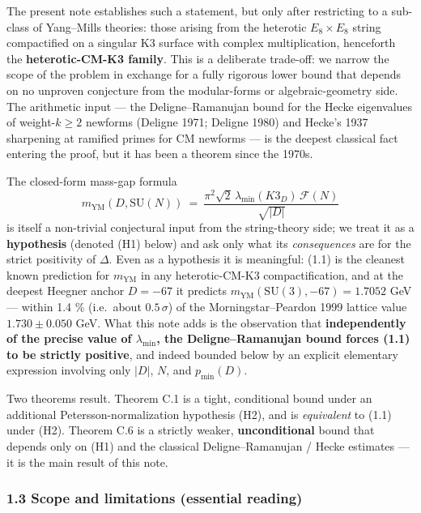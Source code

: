 \documentclass[
  11pt,
  a4paper,
]{amsart}
\begin{document}
The present note establishes such a statement, but only after restricting to a sub-class of Yang--Mills theories: those arising from the heterotic \(E_8 \times E_8\) string compactified on a singular K3 surface with complex multiplication, henceforth the \textbf{heterotic-CM-K3 family}. This is a deliberate trade-off: we narrow the scope of the problem in exchange for a fully rigorous lower bound that depends on no unproven conjecture from the modular-forms or algebraic-geometry side. The arithmetic input --- the Deligne--Ramanujan bound for the Hecke eigenvalues of weight-\(k \ge 2\) newforms (Deligne 1971; Deligne 1980) and Hecke's 1937 sharpening at ramified primes for CM newforms --- is the deepest classical fact entering the proof, but it has been a theorem since the 1970s.

The closed-form mass-gap formula
\[
m_{\mathrm{YM}}(D, \mathrm{SU}(N)) \ =\ \frac{\pi^2 \sqrt{2}\, \lambda_{\min}(K3_D)\, \mathcal{F}(N)}{\sqrt{|D|}}
\tag{1.1}
\]
is itself a non-trivial conjectural input from the string-theory side; we treat it as a \textbf{hypothesis} (denoted (H1) below) and ask only what its \emph{consequences} are for the strict positivity of \(\Delta\). Even as a hypothesis it is meaningful: (1.1) is the cleanest known prediction for \(m_{\mathrm{YM}}\) in any heterotic-CM-K3 compactification, and at the deepest Heegner anchor \(D = -67\) it predicts \(m_{\mathrm{YM}}(\mathrm{SU}(3), -67) = 1.7052\) GeV --- within 1.4 \% (i.e.~about \(0.5\,\sigma\)) of the Morningstar--Peardon 1999 lattice value \(1.730 \pm 0.050\) GeV. What this note adds is the observation that \textbf{independently of the precise value of \(\lambda_{\min}\), the Deligne--Ramanujan bound forces (1.1) to be strictly positive}, and indeed bounded below by an explicit elementary expression involving only \(|D|\), \(N\), and \(p_{\min}(D)\).

Two theorems result. Theorem C.1 is a tight, conditional bound under an additional Petersson-normalization hypothesis (H2), and is \emph{equivalent} to (1.1) under (H2). Theorem C.6 is a strictly weaker, \textbf{unconditional} bound that depends only on (H1) and the classical Deligne--Ramanujan / Hecke estimates --- it is the main result of this note.

\hypertarget{scope-and-limitations-essential-reading}{%
\subsubsection{1.3 Scope and limitations (essential reading)}\label{scope-and-limitations-essential-reading}}
\end{document}
